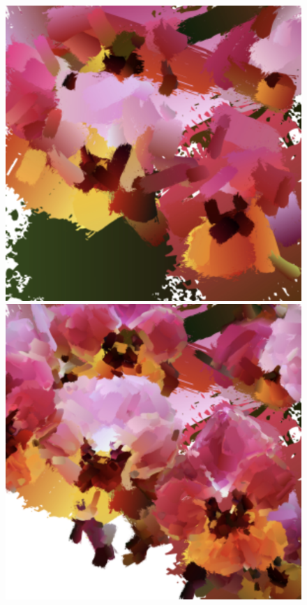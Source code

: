 \begin{figure}[t]
    \centering
    \begin{minipage}[b]{0.32\hsize}
        \centering
        \includegraphics[width=1.0\hsize]{img/art/fast.png}
    \end{minipage}
    \begin{minipage}[b]{0.32\hsize}
        \centering
        \includegraphics[width=1.0\hsize]{img/art/no-balance.png}

\end{minipage}
\end{figure}
